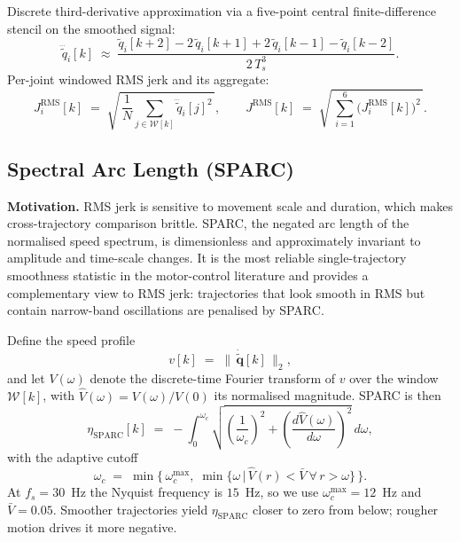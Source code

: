 Discrete third-derivative approximation via a five-point central
finite-difference stencil on the smoothed signal:
\begin{equation}
    \dddot{\tilde{q}}_i[k]
    \;\approx\;
    \frac{\tilde{q}_i[k+2] - 2\,\tilde{q}_i[k+1] + 2\,\tilde{q}_i[k-1] - \tilde{q}_i[k-2]}{2\,T_s^3}.
\end{equation}
Per-joint windowed RMS jerk and its aggregate:
\begin{equation}
    J_i^{\mathrm{RMS}}[k] \;=\; \sqrt{\,\frac{1}{N} \sum_{j \in \mathcal{W}[k]} \dddot{\tilde{q}}_i[j]^2\,},
    \qquad
    J^{\mathrm{RMS}}[k] \;=\; \sqrt{\,\sum_{i=1}^{6} \big(J_i^{\mathrm{RMS}}[k]\big)^2\,}.
\end{equation}

\subsection{Spectral Arc Length (SPARC)}

\textbf{Motivation.} RMS jerk is sensitive to movement scale and duration,
which makes cross-trajectory comparison brittle. SPARC, the negated arc
length of the normalised speed spectrum, is dimensionless and approximately
invariant to amplitude and time-scale changes. It is the most reliable
single-trajectory smoothness statistic in the motor-control literature and
provides a complementary view to RMS jerk: trajectories that look smooth in
RMS but contain narrow-band oscillations are penalised by SPARC.

Define the speed profile
\begin{equation}
    v[k] \;=\; \big\|\, \dot{\tilde{\mathbf{q}}}[k] \,\big\|_2,
\end{equation}
and let $V(\omega)$ denote the discrete-time Fourier transform of $v$ over
the window $\mathcal{W}[k]$, with $\hat{V}(\omega) = V(\omega)/V(0)$ its
normalised magnitude. SPARC is then
\begin{equation}
    \eta_{\mathrm{SPARC}}[k]
    \;=\;
    -\int_{0}^{\omega_c}
    \sqrt{\left(\frac{1}{\omega_c}\right)^{\!2} \!+\! \left(\frac{d\hat{V}(\omega)}{d\omega}\right)^{\!2}}
    \, d\omega,
\end{equation}
with the adaptive cutoff
\begin{equation}
    \omega_c \;=\; \min\!\Big\{\, \omega_c^{\max}, \; \min\!\big\{\omega \,\big|\, \hat{V}(r) < \bar{V}\ \forall\, r > \omega \big\} \,\Big\}.
\end{equation}
At $f_s = 30$~Hz the Nyquist frequency is $15$~Hz, so we use
$\omega_c^{\max} = 12$~Hz and $\bar{V} = 0.05$. Smoother trajectories yield
$\eta_{\mathrm{SPARC}}$ closer to zero from below; rougher motion drives it
more negative.


